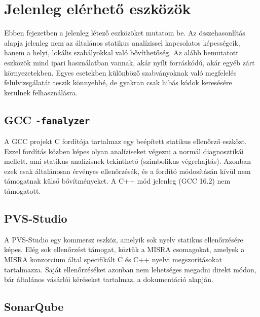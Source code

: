 \chapter{Jelenleg elérhető eszközök}\label{ch:exist}

Ebben fejezetben a jelenleg létező eszközöket mutatom be.
Az összehasonlítás alapja jelenleg nem az általános statikus analízissel kapcsolatos képességeik, hanem a helyi, lokális szabályokkal való bővíthetőség.
Az alább bemutatott eszközök mind ipari használatban vannak, akár nyílt forráskódú, akár egyéb zárt környezetekben.
Egyes esetekben különböző szabványoknak való megfelelés felülvizsgálatát teszik könnyebbé, de gyakran csak hibás kódok keresésére kerülnek felhasználásra.

\section*{GCC {\tt -fanalyzer}}

A \gls{GCC} projekt \cite{freesoftwarefoundationinc.GCCGNUCompiler2026} C fordítója tartalmaz egy beépített statikus ellenőrző eszközt.
Ezzel fordítás közben képes olyan analíziseket végezni a normál diagnosztikái mellett, ami statikus analízisnek tekinthető (szimbolikus végrehajtás).
Azonban ezek csak általánosan érvényes ellenőrzésék, és a fordító módosításán kívül nem támogatnak külső bővítményeket.
A C++ mód jelenleg (\gls{GCC} 16.2) nem támogatott.

\section*{PVS-Studio}

A PVS-Studio \cite{pvs-studiollcPVSStudioSolutionEnhance} egy kommersz eszköz, amelyik sok nyelv statikus ellenőrzésére képes.
Elég sok ellenőrzést támogat, köztük a MISRA csomagokat, amelyek a MISRA konzorcium által specifikált C és C++ \cite{themisraconsortiumlimitedMISRA} nyelvi megszorításokat tartalmazza.
Saját ellenőrzéséket azonban nem lehetséges megadni direkt módon, bár általános vásárlói kéréseket tartalmaz, a dokumentáció alapján.

\section*{SonarQube}

